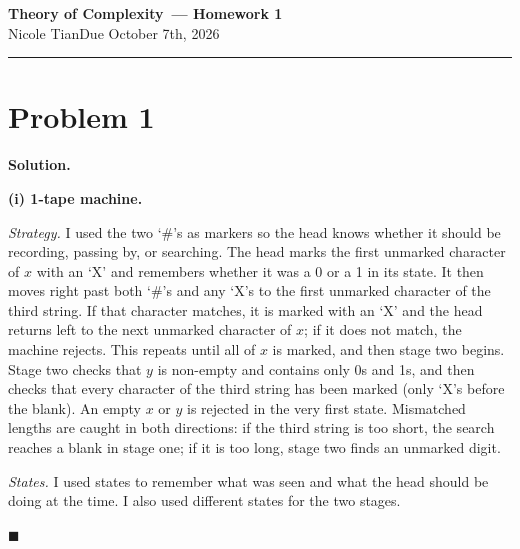 \documentclass[11pt]{article}
\newcommand{\studentname}{Nicole Tian}
\newcommand{\coursename}{Theory of Complexity}
\newcommand{\hwnumber}{1}
\newcommand{\duedate}{October 7th, 2026}
\newenvironment{solution}{%
  \par\noindent\textbf{Solution.}\ \normalfont
}{\hfill$\blacksquare$\par\medskip}
\theoremstyle{plain}
\theoremstyle{definition}
\begin{document}
\begin{center}
  {\Large\bfseries \coursename\ --- Homework \hwnumber}\\[4pt]
  \studentname \quad\textbullet\quad Due \duedate\\[2pt]
\end{center}
\hrule

\section*{Problem 1}
\begin{solution}
\textbf{(i) 1-tape machine.}

\emph{Strategy.}
I used the two `\#'s as markers so the head knows whether it should be recording, passing by, or searching. The head marks the first unmarked character of $x$ with an `X' and remembers whether it was a 0 or a 1 in its state. It then moves right past both `\#'s and any `X's to the first unmarked character of the third string. If that character matches, it is marked with an `X' and the head returns left to the next unmarked character of $x$; if it does not match, the machine rejects. This repeats until all of $x$ is marked, and then stage two begins. Stage two checks that $y$ is non-empty and contains only 0s and 1s, and then checks that every character of the third string has been marked (only `X's before the blank). An empty $x$ or $y$ is rejected in the very first state. Mismatched lengths are caught in both directions: if the third string is too short, the search reaches a blank in stage one; if it is too long, stage two finds an unmarked digit.

\vspace{3pt}
\emph{States.} I used states to remember what was seen and what the head should be doing at the time. I also used different states for the two stages.


\end{solution}
\end{document}
